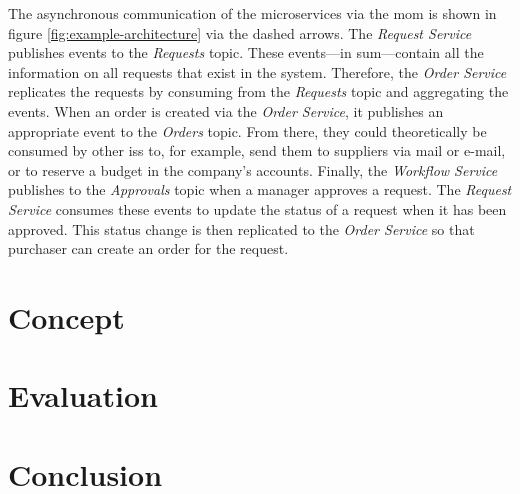 The asynchronous communication of the microservices via the \gls{mom} is shown in figure \ref{fig:example-architecture} via the dashed arrows.
The \emph{Request Service} publishes events to the \emph{Requests} topic.
These events---in sum---contain all the information on all requests that exist in the system.
Therefore, the \emph{Order Service} replicates the requests by consuming from the \emph{Requests} topic and aggregating the events.
When an order is created via the \emph{Order Service}, it publishes an appropriate event to the \emph{Orders} topic.
From there, they could theoretically be consumed by other \glspl{is} to, for example, send them to suppliers via mail or e-mail, or to reserve a budget in the company's accounts.
Finally, the \emph{Workflow Service} publishes to the \emph{Approvals} topic when a manager approves a request.
The \emph{Request Service} consumes these events to update the status of a request when it has been approved.
This status change is then replicated to the \emph{Order Service} so that purchaser can create an order for the request.

\section{Concept}\label{sec:concept}

\section{Evaluation}\label{sec:evaluation}

\section{Conclusion}\label{sec:conclusion}
